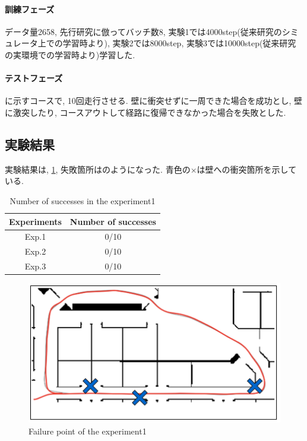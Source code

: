 \newpage
\paragraph{訓練フェーズ}
データ量2658, 先行研究に倣ってバッチ数8, 実験1では4000step(従来研究のシミュレータ上での学習時より), 実験2では8000step, 実験3では10000step(従来研究の実環境での学習時より)学習した.

\paragraph{テストフェーズ}
に示すコースで, 10回走行させる. 壁に衝突せずに一周できた場合を成功とし, 壁に激突したり, コースアウトして経路に復帰できなかった場合を失敗とした.

\subsection{実験結果}
実験結果は, \ref{tb:exp1}, 失敗箇所はのようになった. 青色の×は壁への衝突箇所を示している. 

\begin{table}[h]
  \centering
  \begin{tabular}{|c|c|} \hline
    Experiments & Number of successes \\ \hline
    Exp.1 & 0/10 \\ \hline
    Exp.2 & 0/10 \\ \hline
    Exp.3 & 0/10 \\ \hline
  \end{tabular}
  \caption{Number of successes in the experiment1}
  \label{tb:exp1}
\end{table}

\begin{figure}[h]
  \centering
  \includegraphics[keepaspectratio, scale=0.5]{images/result1.png}
  \caption{Failure point of the experiment1}
  \label{Fig:result1}
  \end{figure}

